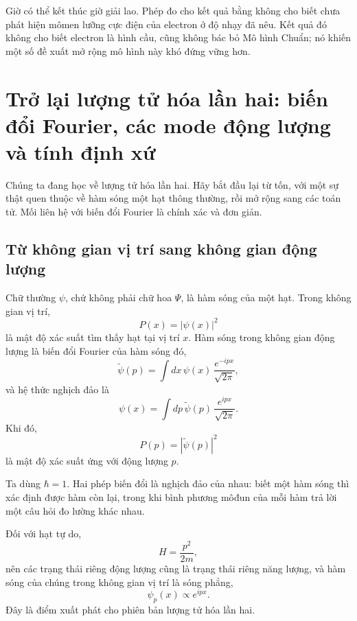 Giờ có thể kết thúc giờ giải lao. Phép đo cho kết quả bằng không cho biết chưa phát hiện mômen lưỡng cực điện của electron ở độ nhạy đã nêu. Kết quả đó không cho biết electron là hình cầu, cũng không bác bỏ Mô hình Chuẩn; nó khiến một số đề xuất mở rộng mô hình này khó đứng vững hơn.

\section{Trở lại lượng tử hóa lần hai: biến đổi Fourier, các mode động lượng và tính định xứ}

Chúng ta đang học về lượng tử hóa lần hai. Hãy bắt đầu lại từ tốn, với một sự thật quen thuộc về hàm sóng một hạt thông thường, rồi mở rộng sang các toán tử. Mối liên hệ với biến đổi Fourier là chính xác và đơn giản.

\subsection{Từ không gian vị trí sang không gian động lượng}

Chữ thường \(\psi\), chứ không phải chữ hoa \(\Psi\), là hàm sóng của một hạt. Trong không gian vị trí,
\begin{equation}
P(x)=|\psi(x)|^2
\end{equation}
là mật độ xác suất tìm thấy hạt tại vị trí \(x\). Hàm sóng trong không gian động lượng là biến đổi Fourier của hàm sóng đó,
\begin{equation}
\tilde{\psi}(p)=\int dx\,\psi(x)\,\frac{e^{-ipx}}{\sqrt{2\pi}},
\end{equation}
và hệ thức nghịch đảo là
\begin{equation}
\psi(x)=\int dp\,\tilde{\psi}(p)\,\frac{e^{ipx}}{\sqrt{2\pi}}.
\end{equation}
Khi đó,
\begin{equation}
P(p)=|\tilde{\psi}(p)|^2
\end{equation}
là mật độ xác suất ứng với động lượng \(p\).

Ta dùng \(\hbar=1\). Hai phép biến đổi là nghịch đảo của nhau: biết một hàm sóng thì xác định được hàm còn lại, trong khi bình phương môđun của mỗi hàm trả lời một câu hỏi đo lường khác nhau.

Đối với hạt tự do,
\begin{equation}
H=\frac{p^2}{2m},
\end{equation}
nên các trạng thái riêng động lượng cũng là trạng thái riêng năng lượng, và hàm sóng của chúng trong không gian vị trí là sóng phẳng,
\begin{equation}
\psi_p(x)\propto e^{ipx}.
\end{equation}
Đây là điểm xuất phát cho phiên bản lượng tử hóa lần hai.

